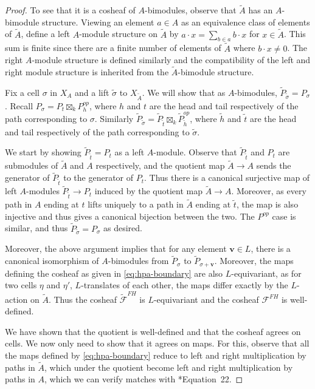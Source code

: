 \documentclass{amsart}
\newcommand{\field}{k}
\theoremstyle{remark}
\begin{document}
\begin{proof}
  To see that it is a cosheaf of $A$-bimodules, observe that $\widetilde{A}$ has an $A$-bimodule structure.
  Viewing an element $a\in A$ as an equivalence class of elements of $\widetilde{A}$,
  define a left $A$-module structure on $\widetilde{A}$ by $a\cdot x = \sum_{b\in a} b\cdot x$ for $x\in \widetilde{A}$.
  This sum is finite since there are a finite number of elements of $\widetilde{A}$ where $b\cdot x \neq 0$.
  The right $A$-module structure is defined similarly and the compatibility of the left and right module structure is inherited from the $\widetilde{A}$-bimodule structure.
  
  Fix a cell $\sigma$ in $X_A$ and a lift $\widetilde{\sigma}$ to $X_{\widetilde{A}}$. We will show that as $A$-bimodules, $\widetilde{P}_{\widetilde{\sigma}} = P_\sigma$.
  Recall $P_{\sigma} =P_{t}\boxtimes_{\field} P^{op}_{h}$, where $h$ and $t$ are the head and tail respectively of the path corresponding to $\sigma$.
  Similarly $\widetilde{P}_{\widetilde{\sigma}} = \widetilde{P}_{\widetilde{t}}\boxtimes_{\field} \widetilde{P}^{op}_{\widetilde{h}}$, where $\widetilde{h}$ and $\widetilde{t}$ are the head and tail respectively of the path corresponding to $\widetilde{\sigma}$.

  We start by showing $\widetilde{P}_{\widetilde{t}}=P_{t}$ as a left $A$-module.
  Observe that $\widetilde{P}_{\widetilde{t}}$ and $P_t$ are submodules of $\widetilde{A}$ and $A$ respectively,
  and the quotient map $\widetilde{A}\rightarrow A$ sends the generator of $\widetilde{P}_{\widetilde{t}}$ to the generator of $P_t$.
  Thus there is a canonical surjective map of left $A$-modules $\widetilde{P}_{\widetilde{t}}\rightarrow P_t$ induced by the quotient map $\widetilde{A}\rightarrow A$.
  Moreover, as every path in $A$ ending at $t$ lifts uniquely to a path in $\widetilde{A}$ ending at $\widetilde{t}$,
  the map is also injective and thus gives a canonical bijection between the two.
  The $P^{op}$ case is similar, and thus $\widetilde{P}_{\widetilde{\sigma}} = P_\sigma$ as desired.

  Moreover, the above argument implies that for any element $\bm{v}\in L$, there is a canonical isomorphism of $A$-bimodules from $\widetilde{P}_\sigma$ to $\widetilde{P}_{\sigma+\bm{v}}$.
  Moreover, the maps defining the cosheaf as given in \eqref{eq:hpa-boundary} are also $L$-equivariant, as for two cells $\eta$ and $\eta'$, $L$-translates of each other, the maps differ exactly by the $L$-action on $\widetilde{A}$. Thus the cosheaf $\widetilde{\mathcal{F}}^{FH}$ is $L$-equivariant and the cosheaf $\mathcal{F}^{FH}$ is well-defined.

  We have shown that the quotient is well-defined and that the cosheaf agrees on cells. We now only need to show that it agrees on maps. For this, observe that all the maps defined by \eqref{eq:hpa-boundary} reduce to left and right multiplication by paths in $\widetilde{A}$, which under the quotient become left and right multiplication by paths in $A$, which we can verify matches with \cite{FH25}*{Equation~22}.
\end{proof}
\end{document}
